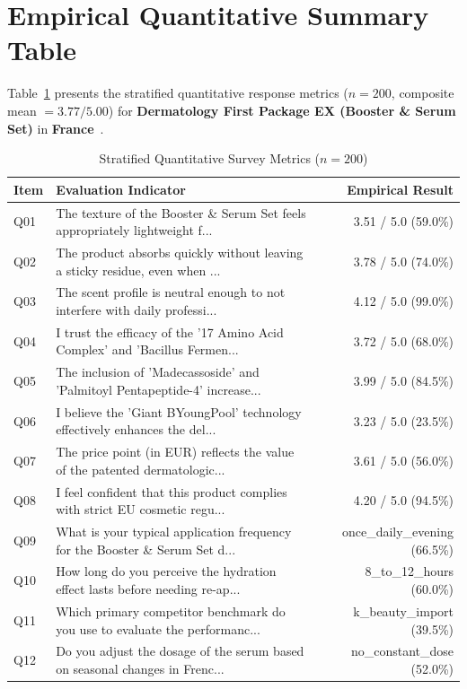 \documentclass[10pt,twocolumn,a4paper]{article}
\begin{document}
\section{Empirical Quantitative Summary Table}
Table~\ref{tab:metrics} presents the stratified quantitative response metrics ($n = 200$, composite mean $= 3.77/5.00$) for \textbf{Dermatology First Package EX (Booster \& Serum Set)} in \textbf{France}~\cite{ref_kaggle_doi,ref_hf_doi}.

\begin{table}[t]
\centering
\caption{Stratified Quantitative Survey Metrics ($n = 200$)}
\label{tab:metrics}
\small
\begin{tabularx}{\textwidth}{l X r}
\toprule
\textbf{Item} & \textbf{Evaluation Indicator} & \textbf{Empirical Result} \\
\midrule
Q01 & The texture of the Booster \& Serum Set feels appropriately lightweight f... & 3.51 / 5.0 (59.0\%) \\
Q02 & The product absorbs quickly without leaving a sticky residue, even when ... & 3.78 / 5.0 (74.0\%) \\
Q03 & The scent profile is neutral enough to not interfere with daily professi... & 4.12 / 5.0 (99.0\%) \\
Q04 & I trust the efficacy of the '17 Amino Acid Complex' and 'Bacillus Fermen... & 3.72 / 5.0 (68.0\%) \\
Q05 & The inclusion of 'Madecassoside' and 'Palmitoyl Pentapeptide-4' increase... & 3.99 / 5.0 (84.5\%) \\
Q06 & I believe the 'Giant BYoungPool' technology effectively enhances the del... & 3.23 / 5.0 (23.5\%) \\
Q07 & The price point (in EUR) reflects the value of the patented dermatologic... & 3.61 / 5.0 (56.0\%) \\
Q08 & I feel confident that this product complies with strict EU cosmetic regu... & 4.20 / 5.0 (94.5\%) \\
Q09 & What is your typical application frequency for the Booster \& Serum Set d... & once\_daily\_evening (66.5\%) \\
Q10 & How long do you perceive the hydration effect lasts before needing re-ap... & 8\_to\_12\_hours (60.0\%) \\
Q11 & Which primary competitor benchmark do you use to evaluate the performanc... & k\_beauty\_import (39.5\%) \\
Q12 & Do you adjust the dosage of the serum based on seasonal changes in Frenc... & no\_constant\_dose (52.0\%) \\

\end{tabularx}
\end{table}
\end{document}

